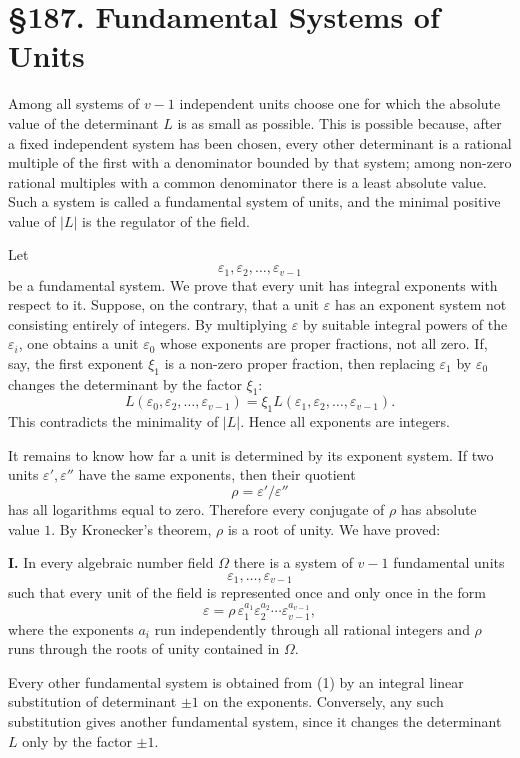 \documentclass[12pt,a4paper]{article}
\newcommand{\webersection}[2]{\clearpage\section*{\S #1. #2}}
\begin{document}
\webersection{187}{Fundamental Systems of Units}

Among all systems of \(v-1\) independent units choose one for which the absolute value of the determinant \(L\) is as small as possible.  This is possible because, after a fixed independent system has been chosen, every other determinant is a rational multiple of the first with a denominator bounded by that system; among non-zero rational multiples with a common denominator there is a least absolute value.  Such a system is called a fundamental system of units, and the minimal positive value of \(|L|\) is the regulator of the field.

Let
\[
  \varepsilon_1,
\varepsilon_2,
\ldots,
\varepsilon_{v-1}
\tag{1}
\]
be a fundamental system.  We prove that every unit has integral exponents with respect to it.  Suppose, on the contrary, that a unit \(\varepsilon\) has an exponent system not consisting entirely of integers.  By multiplying \(\varepsilon\) by suitable integral powers of the \(\varepsilon_i\), one obtains a unit \(\varepsilon_0\) whose exponents are proper fractions, not all zero.  If, say, the first exponent \(\xi_1\) is a non-zero proper fraction, then replacing \(\varepsilon_1\) by \(\varepsilon_0\) changes the determinant by the factor \(\xi_1\):
\[
  L(\varepsilon_0,
\varepsilon_2,
\ldots,
\varepsilon_{v-1})=
  \xi_1 L(\varepsilon_1,
\varepsilon_2,
\ldots,
\varepsilon_{v-1}).
\tag{2}
\]
This contradicts the minimality of \(|L|\).  Hence all exponents are integers.

It remains to know how far a unit is determined by its exponent system.  If two units \(\varepsilon',\varepsilon''\) have the same exponents, then their quotient
\[
  \rho=\varepsilon'/\varepsilon''
\]
has all logarithms equal to zero.  Therefore every conjugate of \(\rho\) has absolute value \(1\).  By Kronecker's theorem, \(\rho\) is a root of unity.  We have proved:

\textbf{I.} In every algebraic number field \(\Omega\) there is a system of \(v-1\) fundamental units
\[
  \varepsilon_1,
\ldots,
\varepsilon_{v-1}
\]
such that every unit of the field is represented once and only once in the form
\[
  \varepsilon=\rho\,
  \varepsilon_1^{a_1}\varepsilon_2^{a_2}\cdots\varepsilon_{v-1}^{a_{v-1}},
\tag{3}
\]
where the exponents \(a_i\) run independently through all rational integers and \(\rho\) runs through the roots of unity contained in \(\Omega\).

Every other fundamental system is obtained from (1) by an integral linear substitution of determinant \(\pm1\) on the exponents.  Conversely, any such substitution gives another fundamental system, since it changes the determinant \(L\) only by the factor \(\pm1\).
\end{document}
